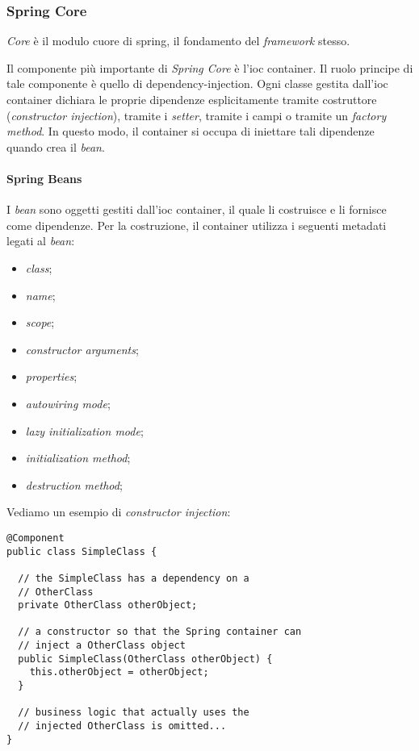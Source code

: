 \subsubsection{Spring Core}

\textit{Core} è il modulo cuore di \gls{spring}, il fondamento del \textit{framework} stesso.

Il componente più importante di \textit{Spring Core} è l'\gls{ioc} container. Il ruolo principe di tale componente è quello di \gls{dependency-injection}\gloss.
Ogni classe gestita dall'\gls{ioc} container dichiara le proprie dipendenze esplicitamente tramite costruttore (\textit{constructor injection}), tramite i \textit{setter}, tramite i campi o tramite un \textit{factory method}.
In questo modo, il container si occupa di iniettare tali dipendenze quando crea il \textit{bean}.

\paragraph*{Spring Beans}\label{section:spring-beans} I \textit{bean} sono oggetti gestiti dall'\gls{ioc} container, il quale li costruisce e li fornisce come dipendenze. Per la costruzione, il container utilizza i seguenti metadati legati al \textit{bean}:
\begin{itemize}
	\item \textit{class};
	\item \textit{name};
	\item \textit{scope};
	\item \textit{constructor arguments};
	\item \textit{properties};
	\item \textit{autowiring mode};
	\item \textit{lazy initialization mode};
	\item \textit{initialization method};
	\item \textit{destruction method};
\end{itemize}

Vediamo un esempio di \textit{constructor injection}:

\begin{tcolorbox}
	\begin{lstlisting}
@Component
public class SimpleClass {

  // the SimpleClass has a dependency on a
  // OtherClass
  private OtherClass otherObject;
	
  // a constructor so that the Spring container can
  // inject a OtherClass object
  public SimpleClass(OtherClass otherObject) {
    this.otherObject = otherObject;
  }

  // business logic that actually uses the
  // injected OtherClass is omitted...
}
	\end{lstlisting}
\end{tcolorbox}

